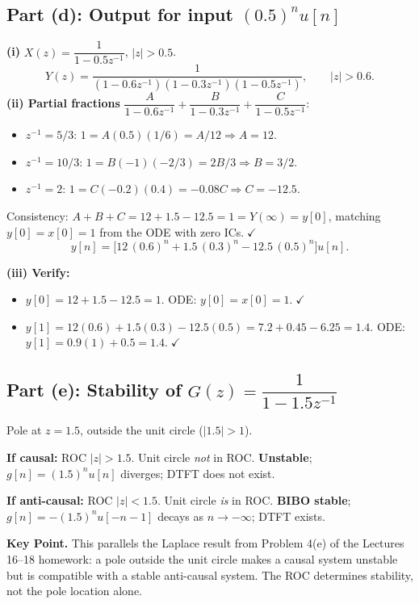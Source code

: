 \documentclass[11pt]{article}
\begin{document}
\subsection*{Part (d): Output for input $(0.5)^{n}u[n]$}
\textbf{(i)} $X(z)=\dfrac{1}{1-0.5z^{-1}}$, $|z|>0.5$.
\[
Y(z)=\frac{1}{(1-0.6z^{-1})(1-0.3z^{-1})(1-0.5z^{-1})}, \qquad |z|>0.6.
\]
\textbf{(ii) Partial fractions} $\dfrac{A}{1-0.6z^{-1}}+\dfrac{B}{1-0.3z^{-1}}+\dfrac{C}{1-0.5z^{-1}}$:
\begin{itemize}[leftmargin=*]
\item $z^{-1}=5/3$: $1=A(0.5)(1/6)=A/12\Rightarrow A=12$.
\item $z^{-1}=10/3$: $1=B(-1)(-2/3)=2B/3\Rightarrow B=3/2$.
\item $z^{-1}=2$: $1=C(-0.2)(0.4)=-0.08C\Rightarrow C=-12.5$.
\end{itemize}
Consistency: $A+B+C=12+1.5-12.5=1=Y(\infty)=y[0]$, matching $y[0]=x[0]=1$ from the ODE with zero ICs.$\;\checkmark$
\begin{equation*}
\boxed{y[n]=\bigl[12\,(0.6)^{n}+1.5\,(0.3)^{n}-12.5\,(0.5)^{n}\bigr]u[n].}
\end{equation*}

\textbf{(iii) Verify:}
\begin{itemize}[leftmargin=*]
\item $y[0]=12+1.5-12.5=1$. ODE: $y[0]=x[0]=1.\;\checkmark$
\item $y[1]=12(0.6)+1.5(0.3)-12.5(0.5)=7.2+0.45-6.25=1.4$. ODE: $y[1]=0.9(1)+0.5=1.4.\;\checkmark$
\end{itemize}

\subsection*{Part (e): Stability of $G(z)=\dfrac{1}{1-1.5z^{-1}}$}
Pole at $z=1.5$, outside the unit circle ($|1.5|>1$).

\textbf{If causal:} ROC $|z|>1.5$. Unit circle \emph{not} in ROC. \textbf{Unstable}; $g[n]=(1.5)^{n}u[n]$ diverges; DTFT does not exist.

\textbf{If anti-causal:} ROC $|z|<1.5$. Unit circle \emph{is} in ROC. \textbf{BIBO stable}; $g[n]=-(1.5)^{n}u[-n-1]$ decays as $n\to-\infty$; DTFT exists.

\medskip\noindent\textbf{Key Point.} This parallels the Laplace result from Problem 4(e) of the Lectures 16--18 homework: a pole outside the unit circle makes a causal system unstable but is compatible with a stable anti-causal system. The ROC determines stability, not the pole location alone.
\end{document}
